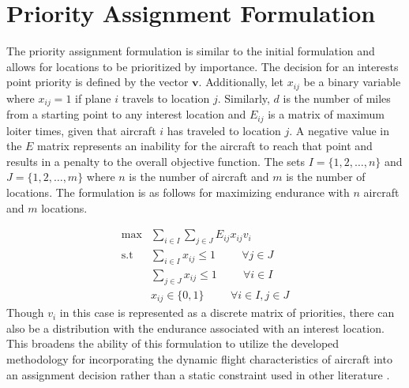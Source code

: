 \section{Priority Assignment Formulation}
The priority assignment formulation is similar to the initial formulation and allows for locations to be prioritized by importance. The decision for an interests point priority is defined by the vector $\mathbf{v}$. Additionally, let $x_{ij}$ be a binary variable where $x_{ij} = 1$ if plane $i$ travels to location $j$. Similarly, $d$ is the number of miles from a starting point to any interest location and $E_{ij}$ is a matrix of maximum loiter times, given that aircraft $i$ has traveled to location $j$. A negative value in the $E$ matrix represents an inability for the aircraft to reach that point and results in a penalty to the overall objective function. The sets $I = \{1,2,\dots,n\}$ and $J = \{1,2,\dots,m\}$ where $n$ is the number of aircraft and $m$ is the number of locations. The formulation is as follows for maximizing endurance with $n$ aircraft and $m$ locations.\par
\begin{equation}
    \begin{aligned}
        \max &\sum_{i\in I}\sum_{j\in J} E_{ij}x_{ij}v_{i}\hspace{1cm}\\
        \text{s.t } &\sum_{i\in I}x_{ij} \leq 1\hspace{1cm} \forall j\in J\\
        &\sum_{j\in J}x_{ij} \leq 1\hspace{1cm} \forall i \in I\\
        &x_{ij}\in \{0,1\} \hspace{1cm} \forall i\in I, j\in J
    \end{aligned}
\end{equation}
Though $v_i$ in this case is represented as a discrete matrix of priorities, there can also be a distribution with the endurance associated with an interest location. This broadens the ability of this formulation to utilize the developed methodology for incorporating the dynamic flight characteristics of aircraft into an assignment decision rather than a static constraint used in other literature \cite{Alighanbari,Schumacher,Taylor}.
